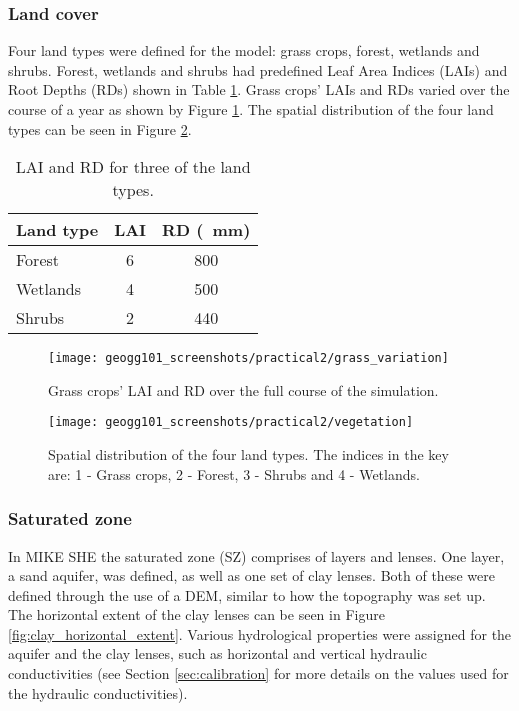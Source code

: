 \documentclass{article}
\begin{document}
\subsubsection{Land cover}

Four land types were defined for the model: grass crops, forest, wetlands and shrubs. Forest, wetlands and shrubs had predefined Leaf Area Indices (LAIs) and Root Depths (RDs) shown in Table \ref{table:lai_rd}. Grass crops' LAIs and RDs varied over the course of a year as shown by Figure \ref{fig:grass_variation}. The spatial distribution of the four land types can be seen in Figure \ref{fig:vegetation}.

\setlength\extrarowheight{3pt}
\begin{table}[!h]
    \centering
    \begin{tabular}{l c c}
	Land type   & LAI & RD (\SI{}{mm}) \\
	    \hline
	    Forest & \num{6} & \num{800} \\
	    Wetlands & \num{4} & \num{500} \\
	    Shrubs & \num{2} & \num{440} \\
    \end{tabular}
    \caption{LAI and RD for three of the land types.}
    \label{table:lai_rd}
\end{table}


\begin{figure}[!h]
    \centering
    \texttt{[image: geogg101\_screenshots/practical2/grass\_variation]}
    \caption{Grass crops' LAI and RD over the full course of the simulation.}
    \label{fig:grass_variation}
\end{figure}

\begin{figure}[!h]
    \centering
    \texttt{[image: geogg101\_screenshots/practical2/vegetation]}
    \caption{Spatial distribution of the four land types. The indices in the key are: 1 - Grass crops, 2 - Forest, 3 - Shrubs and 4 - Wetlands. }
    \label{fig:vegetation}
\end{figure}


\subsubsection{Saturated zone}

In MIKE SHE the saturated zone (SZ) comprises of layers and lenses. One layer, a sand aquifer, was defined, as well as one set of clay lenses. Both of these were defined through the use of a DEM, similar to how the topography was set up. The horizontal extent of the clay lenses can be seen in Figure \ref{fig:clay_horizontal_extent}. Various hydrological properties were assigned for the aquifer and the clay lenses, such as horizontal and vertical hydraulic conductivities (see Section \ref{sec:calibration} for more details on the values used for the hydraulic conductivities).
\end{document}
